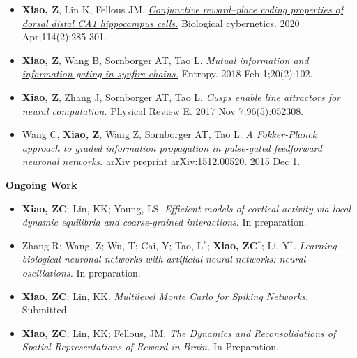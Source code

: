 \documentclass[margin, 11pt]{res} %
\begin{document}
\begin{resume}
\begin{itemize}
\item  \textbf{Xiao, Z}, Lin K, Fellous JM. \href{https://link.springer.com/article/10.1007/s00422-020-00830-0}{\textit{Conjunctive reward–place coding properties of dorsal distal CA1 hippocampus cells.}} Biological cybernetics. 2020 Apr;114(2):285-301.

\item \textbf{Xiao, Z}, Wang B, Sornborger AT, Tao L. \href{https://doi.org/10.3390/e20020102}{\textit{Mutual information and information gating in synfire chains.}} Entropy. 2018 Feb 1;20(2):102.

\item \textbf{Xiao, Z}, Zhang J, Sornborger AT, Tao L. \href{https://doi.org/10.1103/PhysRevE.96.052308}{\textit{Cusps enable line attractors for neural computation.}} Physical Review E. 2017 Nov 7;96(5):052308.

\item Wang C, \textbf{Xiao, Z}, Wang Z, Sornborger AT, Tao L. \href{
https://doi.org/10.48550/arXiv.1512.00520}{\textit{A Fokker-Planck approach to graded information propagation in pulse-gated feedforward neuronal networks.}} arXiv preprint arXiv:1512.00520. 2015 Dec 1.
\end{itemize}


\medskip
{\bf Ongoing Work}
\begin{itemize}
\item \textbf{Xiao, ZC}; Lin, KK; Young, LS. \textit{Efficient models of cortical activity via
  local dynamic equilibria and coarse-grained interactions}. In preparation.

\item Zhang R; Wang, Z; Wu, T; Cai, Y; Tao, L$^*$; \textbf{Xiao, ZC$^*$}; Li, Y$^*$. \textit{Learning biological neuronal networks with artificial neural networks: neural oscillations.} In preparation.


\item \textbf{Xiao, ZC}; Lin, KK. \textit{Multilevel Monte Carlo for Spiking Networks.} Submitted.

\item \textbf{Xiao, ZC}; Lin, KK; Fellous, JM. \textit{The Dynamics and Reconsolidations of Spatial Representations of Reward in Brain.} In Preparation.

\end{itemize}



\end{resume}
\end{document}
